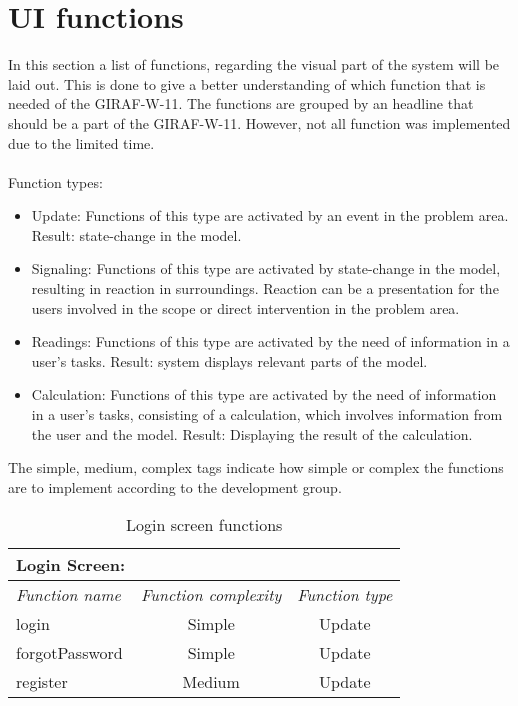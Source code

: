 \newpage
\section{UI functions}
In this section a list of functions, regarding the visual part of the system will be laid out. This is done to give a better understanding of which function that is needed of the GIRAF-W-11. The functions are grouped by an headline that should be a part of the GIRAF-W-11. However, not all function was implemented due to the limited time.  
\\
\\
Function types:
\begin{itemize}
\item{Update: Functions of this type are activated by an event in the problem area. Result: state-change in the model.}

\item{Signaling: Functions of this type are activated by state-change in the model, resulting in reaction in surroundings. Reaction can be a presentation for the users involved in the scope or direct intervention in the problem area.}

\item{Readings: Functions of this type are activated by the need of information in a user's tasks. Result: system displays relevant parts of the model.}

\item{Calculation: Functions of this type are activated by the need of information in a user's tasks, consisting of a calculation, which involves information from the user and the model. Result: Displaying the result of the calculation.}

\end{itemize}

The simple, medium, complex tags indicate how simple or complex the functions are to implement according to the development group.

\begin{table}[!ht]
\centering
\begin{tabular}{ l  c  c }

Login Screen: &  & \\ \hline
\textit{Function name} & \textit{Function complexity} & \textit{Function type} \\ \hline
login & Simple & Update \\ \hline
forgotPassword & Simple & Update \\ \hline
register & Medium & Update \\ \hline
\end{tabular}
\caption{Login screen functions}
\label{tbl:loginscreen}
\end{table}

